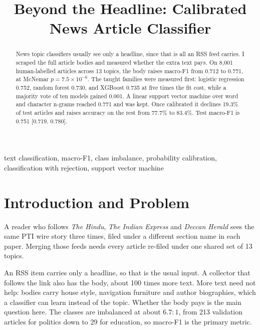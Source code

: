 \documentclass[conference]{IEEEtran}
\begin{document}
\title{Beyond the Headline: Calibrated News Article Classifier}

\author{
}

\maketitle

\begin{abstract}
News topic classifiers usually see only a headline, since that is all an RSS feed
carries. I scraped the full article bodies and measured whether the extra text pays. On
8,001 human-labelled articles across 13 topics, the body raises macro-F1 from 0.712 to
0.771, at McNemar $p = 7.5\times10^{-6}$. The taught families were measured first:
logistic regression 0.752, random forest 0.730, and XGBoost 0.735 at five times the fit
cost, while a majority vote of ten models gained 0.001. A linear support vector machine
over word and character n-grams reached 0.771 and was kept. Once calibrated it declines
19.3\% of test articles and raises accuracy on the rest from 77.7\% to 83.4\%. Test
macro-F1 is 0.751 [0.719, 0.780].\end{abstract}
\begin{IEEEkeywords}
text classification, macro-F1, class imbalance, probability calibration, classification
with rejection, support vector machine
\end{IEEEkeywords}

\section{Introduction and Problem}

A reader who follows \textit{The Hindu}, \textit{The Indian Express} and
\textit{Deccan Herald} sees the same PTI wire story three times, filed under a different
section name in each paper. Merging those feeds needs every article re-filed under one
shared set of 13 topics.

An RSS item carries only a headline, so that is the usual input. A collector that follows
the link also has the body, about 100 times more text. More text need not help: bodies
carry house style, navigation furniture and author biographies, which a classifier can
learn instead of the topic. Whether the body pays is the main question here. The classes
are imbalanced at about $6.7\!:\!1$, from 213 validation articles for politics down to 29
for education, so macro-F1 is the primary metric.
\end{document}
